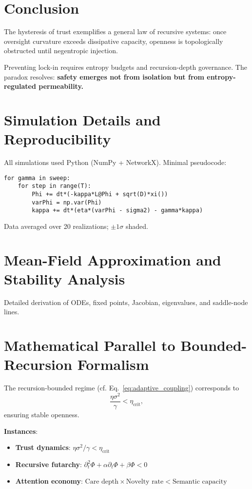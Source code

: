 \documentclass[12pt,a4paper]{article}
\begin{document}
\section{Conclusion}
The hysteresis of trust exemplifies a general law of recursive systems: once oversight curvature exceeds dissipative capacity, openness is topologically obstructed until negentropic injection.

Preventing lock-in requires entropy budgets and recursion-depth governance. The paradox resolves: \textbf{safety emerges not from isolation but from entropy-regulated permeability.}

\appendix

\section{Simulation Details and Reproducibility}
All simulations used Python (NumPy + NetworkX). Minimal pseudocode:
\begin{verbatim}
for gamma in sweep:
    for step in range(T):
        Phi += dt*(-kappa*L@Phi + sqrt(D)*xi())
        varPhi = np.var(Phi)
        kappa += dt*(eta*(varPhi - sigma2) - gamma*kappa)
\end{verbatim}
Data averaged over 20 realizations; $\pm1\sigma$ shaded.

\section{Mean-Field Approximation and Stability Analysis}
\label{app:meanfield}
Detailed derivation of ODEs, fixed points, Jacobian, eigenvalues, and saddle-node lines.

\section{Mathematical Parallel to Bounded-Recursion Formalism}
The recursion-bounded regime (cf. Eq.~\ref{eq:adaptive_coupling}) corresponds to
\begin{equation}
\frac{\eta\sigma^2}{\gamma} < \eta_{\mathrm{crit}},
\label{eq:recursion_bound}
\end{equation}
ensuring stable openness.


\textbf{Instances}:
\begin{itemize}
\item \textbf{Trust dynamics}: $\eta\sigma^2/\gamma < \eta_{\text{crit}}$
\item \textbf{Recursive futarchy}: $\partial_t^2\Phi + \alpha\partial_t\Phi + \beta\Phi < 0$
\item \textbf{Attention economy}: $\text{Care depth} \times \text{Novelty rate} < \text{Semantic capacity}$
\end{itemize}
\end{document}
